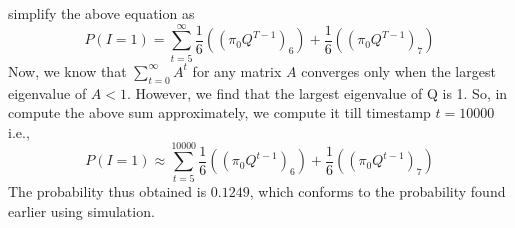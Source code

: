 \documentclass{article}
\begin{document}
\begin{enumerate}
        simplify the above equation as
        \begin{equation}
        \nonumber
            P(I=1) = \sum_{t=5}^{\infty} \frac{1}{6}((\pi_{0}Q^{T-1})_{6}) + \frac{1}{6}((\pi_{0}Q^{T-1})_{7})
        \end{equation}
        Now, we know that $\sum_{t=0}^{\infty} A^{t}$ for any matrix $A$ converges only when the largest eigenvalue of $A < 1$. However,
        we find that the largest eigenvalue of Q is 1. So, in compute the above sum approximately, we compute it till timestamp $t=10000$ i.e.,
        \begin{equation}
        \nonumber
            P(I=1) \approx \sum_{t=5}^{10000} \frac{1}{6}((\pi_{0}Q^{t-1})_{6}) + \frac{1}{6}((\pi_{0}Q^{t-1})_{7})
        \end{equation}
        The probability thus obtained is $0.1249$, which conforms to the probability found earlier using simulation. 
\end{enumerate}
\end{document}
